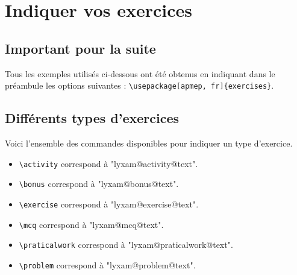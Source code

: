 \documentclass[12pt,a4paper]{article}
\makeatletter
\newcommand\@IDoptarg{\@ifstar{\@IDoptargStar}{\@IDoptargNoStar}}
\newcommand\@IDoptargStar[2]{%
        \vspace{0.5em}
        --- \texttt{#1%
            \IfStrEq{#2}{}{:}{\,#2:}%
        }%
    }
\newcommand\@IDoptargNoStar[2]{%
        \IfStrEq{#2}{}{%
            \@IDoptargStar{#1}{}%
        }{%
            \@IDoptargStar{#1}{\##2}%
        }%
    }
\newcommand\IDoption{\@ifstar{\@IDoptionStar}{\@IDoptionNoStar}}
\newcommand\@IDoptionStar[1]{%
        \@IDoptarg*{Option}{{\itshape "#1"}}%
    }
\newcommand\@IDoptionNoStar[1]{%
        \@IDoptarg{Option}{#1}%
    }
\makeatother
\begin{document}
\newcommand\exosoptions{
\IDoption*{pts} le nombre de points avec le cas particulier de $0$ qui demande d'afficher "Non noté".

\IDoption*{time} la durée de l'exercice.

\IDoption*{id} un texte de votre choix pour remplacer le numéro (ceci a pour effet de bloquer temporairement la numérotation).

\IDoption*{title} un titre. 

\IDoption*{note} une petite indication liée à l'exercice (comme par exemple qu'il ne s'adresse qu'aux élèves motivés).

\IDoption*{src} la source utilisée pour confectionner l'exercice.
}


\section{Indiquer vos exercices}

    \subsection{Important pour la suite}

Tous les exemples utilisés ci-dessous ont été obtenus en indiquant dans le préambule les options suivantes : \verb+\usepackage[apmep, fr]{exercises}+.


    \subsection{Différents types d'exercices}

Voici l'ensemble des commandes disponibles pour indiquer un type d'exercice.

\begin{itemize}[label=\textbullet]
\makeatletter
    \item \verb+\activity+ correspond à "lyxam@activity@text{}".
    
    \item \verb+\bonus+ correspond à "lyxam@bonus@text{}".
    
    \item \verb+\exercise+ correspond à "lyxam@exercise@text{}".
    
    \item \verb+\mcq+ correspond à "lyxam@mcq@text{}".
    
    \item \verb+\praticalwork+ correspond à "lyxam@praticalwork@text{}".
    
    \item \verb+\problem+ correspond à "lyxam@problem@text{}".
\makeatother
\end{itemize}
\end{document}
